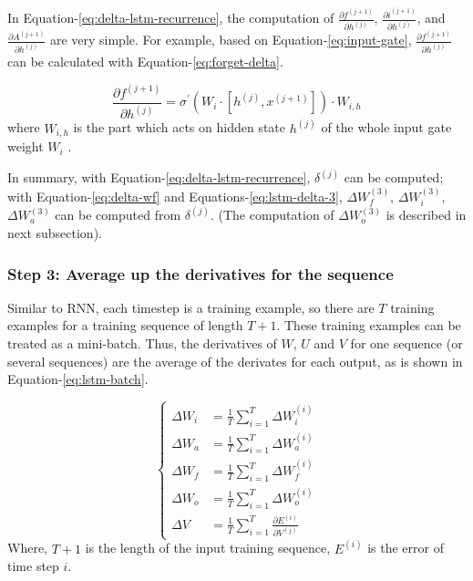 \documentclass{article}
\begin{document}
In Equation-\ref{eq:delta-lstm-recurrence}, the computation of $\frac{\partial f^{(j+1)}}{\partial h^{(j)}}$, $\frac{\partial i^{(j+1)}}{\partial h^{(j)}}$, and 
$\frac{\partial A^{(j+1)}}{\partial h^{(j)}}$ are very simple. For example, based on Equation-\ref{eq:input-gate}, 
$\frac{\partial f^{(j+1)}}{\partial h^{(j)}}$ can be calculated with Equation-\ref{eq:forget-delta}.

\begin{equation}\label{eq:forget-delta}
     \frac{\partial f^{(j+1)}}{\partial h^{(j)}} = \sigma^{\prime}(W_i \cdot [h^{(j)}, x^{(j+1)}]) \cdot W_{i,h}
\end{equation}
where $W_{i,h}$ is the part which acts on hidden state $h^{(j)}$ of the whole input gate weight $W_i$ .

In summary, with Equation-\ref{eq:delta-lstm-recurrence},  $\delta^{(j)}$ can be computed; 
with Equation-\ref{eq:delta-wf} and Equations-\ref{eq:lstm-delta-3},  $\Delta W^{(3)}_f$,  $\Delta W^{(3)}_i$, $\Delta W^{(3)}_a$ can be computed from $\delta^{(j)}$. (The computation of $\Delta W^{(3)}_o$ is described in next subsection).

\subsubsection{Step 3: Average up the derivatives for the sequence}
Similar to RNN, each timestep is a training example, so there are $T$ training examples for a training sequence of length $T+1$.
These training examples can be treated as a mini-batch.  Thus, the derivatives of $W$, $U$ and $V$ for one sequence (or several sequences) are the
average of the derivates for each output, as is shown in Equation-\ref{eq:lstm-batch}.
 
 \begin{equation}\label{eq:lstm-batch}\begin{cases}
\Delta W_i &=  \frac{1}{T}\sum\limits_{i=1}^T\Delta W^{(i)}_i\\
\Delta W_a&=  \frac{1}{T}\sum\limits_{i=1}^T\Delta W^{(i)}_a\\
\Delta W_f &=  \frac{1}{T}\sum\limits_{i=1}^T\Delta W^{(i)}_f\\
\Delta W_o &=  \frac{1}{T}\sum\limits_{i=1}^T\Delta W^{(i)}_o\\
\Delta V &=  \frac{1}{T}\sum\limits_{i=1}^T\frac{\partial E^{(i)}}{\partial V^{(j)}}
\end{cases}\end{equation}
Where, $T+1$ is the length of the input training sequence, $E^{(i)}$ is the error of time step $i$.
 
\end{document}
